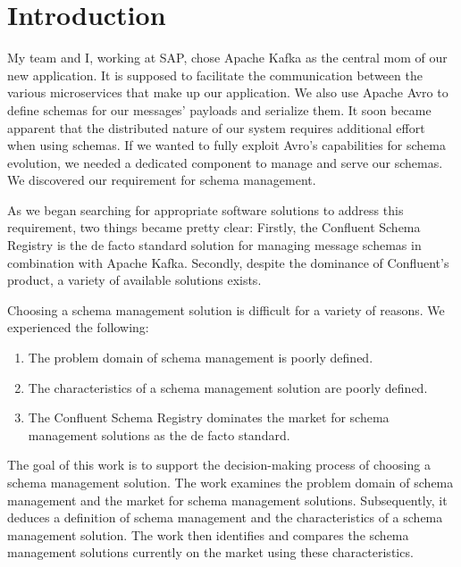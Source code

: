 
\section{Introduction}\label{sec:introduction}

My team and I, working at SAP, chose Apache Kafka as the central \gls{mom} of our new application.
It is supposed to facilitate the communication between the various microservices that make up our application.
We also use Apache Avro to define schemas for our messages' payloads and serialize them.
It soon became apparent that the distributed nature of our system requires additional effort when using schemas.
If we wanted to fully exploit Avro's capabilities for schema evolution, we needed a dedicated component to manage and serve our schemas.
We discovered our requirement for schema management.

As we began searching for appropriate software solutions to address this requirement, two things became pretty clear: Firstly, the Confluent Schema Registry is the de facto standard solution for managing message schemas in combination with Apache Kafka. Secondly, despite the dominance of Confluent's product, a variety of available solutions exists.

Choosing a schema management solution is difficult for a variety of reasons. We experienced the following:

\begin{enumerate}
  \item The problem domain of schema management is poorly defined.
  \item The characteristics of a schema management solution are poorly defined.
  \item The Confluent Schema Registry dominates the market for schema management solutions as the de facto standard.
\end{enumerate}

The goal of this work is to support the decision-making process of choosing a schema management solution.
The work examines the problem domain of schema management and the market for schema management solutions.
Subsequently, it deduces a definition of schema management and the characteristics of a schema management solution.
The work then identifies and compares the schema management solutions currently on the market using these characteristics.

